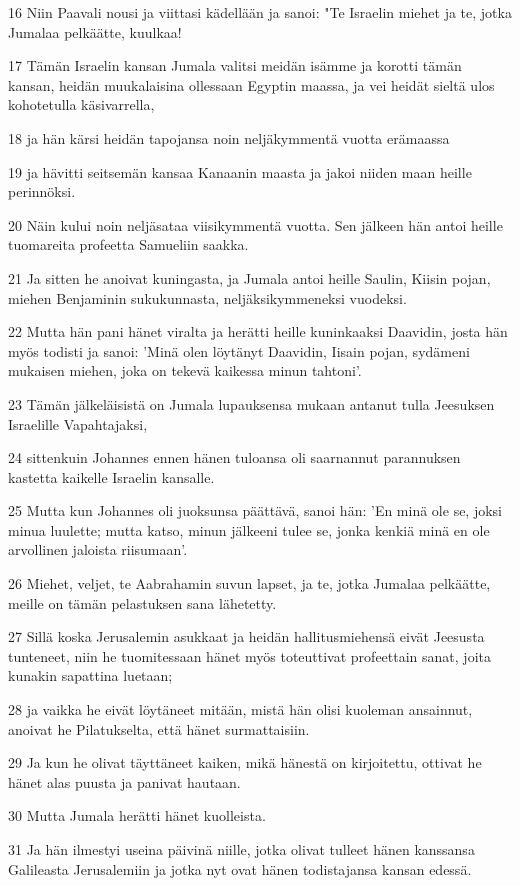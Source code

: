 \par 16 Niin Paavali nousi ja viittasi kädellään ja sanoi: "Te Israelin miehet ja te, jotka Jumalaa pelkäätte, kuulkaa!
\par 17 Tämän Israelin kansan Jumala valitsi meidän isämme ja korotti tämän kansan, heidän muukalaisina ollessaan Egyptin maassa, ja vei heidät sieltä ulos kohotetulla käsivarrella,
\par 18 ja hän kärsi heidän tapojansa noin neljäkymmentä vuotta erämaassa
\par 19 ja hävitti seitsemän kansaa Kanaanin maasta ja jakoi niiden maan heille perinnöksi.
\par 20 Näin kului noin neljäsataa viisikymmentä vuotta. Sen jälkeen hän antoi heille tuomareita profeetta Samueliin saakka.
\par 21 Ja sitten he anoivat kuningasta, ja Jumala antoi heille Saulin, Kiisin pojan, miehen Benjaminin sukukunnasta, neljäksikymmeneksi vuodeksi.
\par 22 Mutta hän pani hänet viralta ja herätti heille kuninkaaksi Daavidin, josta hän myös todisti ja sanoi: 'Minä olen löytänyt Daavidin, Iisain pojan, sydämeni mukaisen miehen, joka on tekevä kaikessa minun tahtoni'.
\par 23 Tämän jälkeläisistä on Jumala lupauksensa mukaan antanut tulla Jeesuksen Israelille Vapahtajaksi,
\par 24 sittenkuin Johannes ennen hänen tuloansa oli saarnannut parannuksen kastetta kaikelle Israelin kansalle.
\par 25 Mutta kun Johannes oli juoksunsa päättävä, sanoi hän: 'En minä ole se, joksi minua luulette; mutta katso, minun jälkeeni tulee se, jonka kenkiä minä en ole arvollinen jaloista riisumaan'.
\par 26 Miehet, veljet, te Aabrahamin suvun lapset, ja te, jotka Jumalaa pelkäätte, meille on tämän pelastuksen sana lähetetty.
\par 27 Sillä koska Jerusalemin asukkaat ja heidän hallitusmiehensä eivät Jeesusta tunteneet, niin he tuomitessaan hänet myös toteuttivat profeettain sanat, joita kunakin sapattina luetaan;
\par 28 ja vaikka he eivät löytäneet mitään, mistä hän olisi kuoleman ansainnut, anoivat he Pilatukselta, että hänet surmattaisiin.
\par 29 Ja kun he olivat täyttäneet kaiken, mikä hänestä on kirjoitettu, ottivat he hänet alas puusta ja panivat hautaan.
\par 30 Mutta Jumala herätti hänet kuolleista.
\par 31 Ja hän ilmestyi useina päivinä niille, jotka olivat tulleet hänen kanssansa Galileasta Jerusalemiin ja jotka nyt ovat hänen todistajansa kansan edessä.
